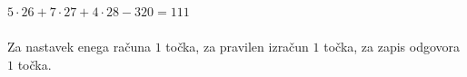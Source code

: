 \documentclass[addpoints]{exam}
\begin{document}
\begin{questions}
    \begin{solution}[4cm]
        $5\cdot 26+7\cdot 27+4\cdot 28-320=111$ \\ \\
        Za nastavek enega računa $1$ točka, za pravilen izračun $1$ točka, za zapis odgovora $1$ točka.
    \end{solution}





\end{questions}
\end{document}
